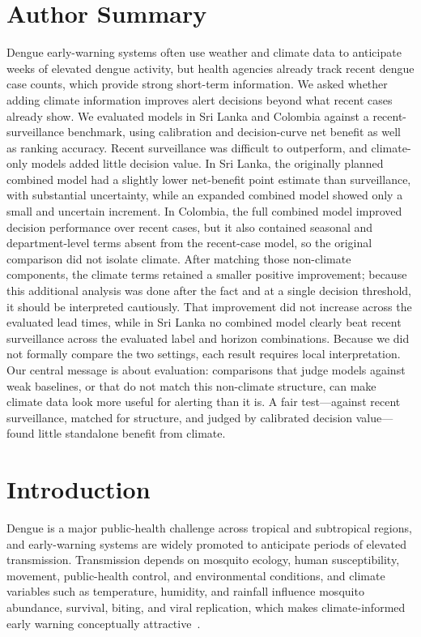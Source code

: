 \documentclass[11pt,a4paper]{article}
\begin{document}
\section*{Author Summary}
Dengue early-warning systems often use weather and climate data to anticipate weeks of elevated dengue activity, but health agencies already track recent dengue case counts, which provide strong short-term information. We asked whether adding climate information improves alert decisions beyond what recent cases already show. We evaluated models in Sri Lanka and Colombia against a recent-surveillance benchmark, using calibration and decision-curve net benefit as well as ranking accuracy. Recent surveillance was difficult to outperform, and climate-only models added little decision value. In Sri Lanka, the originally planned combined model had a slightly lower net-benefit point estimate than surveillance, with substantial uncertainty, while an expanded combined model showed only a small and uncertain increment. In Colombia, the full combined model improved decision performance over recent cases, but it also contained seasonal and department-level terms absent from the recent-case model, so the original comparison did not isolate climate. After matching those non-climate components, the climate terms retained a smaller positive improvement; because this additional analysis was done after the fact and at a single decision threshold, it should be interpreted cautiously. That improvement did not increase across the evaluated lead times, while in Sri Lanka no combined model clearly beat recent surveillance across the evaluated label and horizon combinations. Because we did not formally compare the two settings, each result requires local interpretation. Our central message is about evaluation: comparisons that judge models against weak baselines, or that do not match this non-climate structure, can make climate data look more useful for alerting than it is. A fair test---against recent surveillance, matched for structure, and judged by calibrated decision value---found little standalone benefit from climate.

\section{Introduction}

Dengue is a major public-health challenge across tropical and subtropical regions, and early-warning systems are widely promoted to anticipate periods of elevated transmission. Transmission depends on mosquito ecology, human susceptibility, movement, public-health control, and environmental conditions, and climate variables such as temperature, humidity, and rainfall influence mosquito abundance, survival, biting, and viral replication, which makes climate-informed early warning conceptually attractive~\cite{Mordecai2017,Huber2018}.
\end{document}
